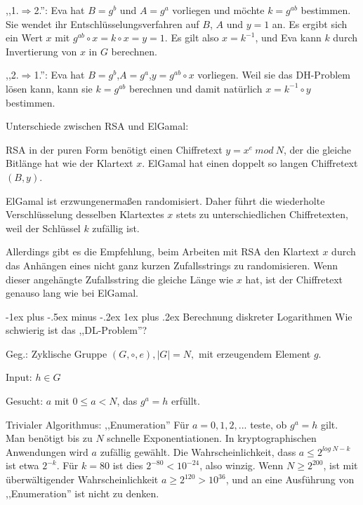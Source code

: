 \documentclass[a4paper]{article}
\makeatletter
\renewcommand{\subsubsection}{\@startsection{subsubsection}{3}{0mm}%
 {-1ex plus -.5ex minus -.2ex}%
 {1ex plus .2ex}%
 {\normalfont\small\bfseries}}
\makeatother
\begin{document}
\begin{multicols}{3}
        \begin{itemize*}
            \item ,,1.$\Rightarrow$2.'': Eva hat $B=g^b$ und $A=g^a$ vorliegen und möchte $k=g^{ab}$ bestimmen. Sie wendet ihr Entschlüsselungsverfahren auf $B$, $A$ und $y=1$ an. Es ergibt sich ein Wert $x$ mit $g^{ab}\circ x=k\circ x=y=1$. Es gilt also $x=k^{-1}$, und Eva kann $k$ durch Invertierung von $x$ in $G$ berechnen.
            \item ,,2.$\Rightarrow$1.'': Eva hat $B=g^b$,$A=g^a$,$y=g^{ab}\circ x$ vorliegen. Weil sie das DH-Problem lösen kann, kann sie $k=g^{ab}$ berechnen und damit natürlich $x=k^{-1}\circ y$ bestimmen.
        \end{itemize*}

        Unterschiede zwischen RSA und ElGamal:
        \begin{itemize*}
            \item RSA in der puren Form benötigt einen Chiffretext $y=x^e\ mod\ N$, der die gleiche Bitlänge hat wie der Klartext $x$. ElGamal hat einen doppelt so langen Chiffretext $(B,y)$.
            \item ElGamal ist erzwungenermaßen randomisiert. Daher führt die wiederholte Verschlüsselung desselben Klartextes $x$ stets zu unterschiedlichen Chiffretexten, weil der Schlüssel $k$ zufällig ist.
        \end{itemize*}

        Allerdings gibt es die Empfehlung, beim Arbeiten mit RSA den Klartext $x$ durch das Anhängen eines nicht ganz kurzen Zufallsstrings zu
        randomisieren. Wenn dieser angehängte Zufallsstring die gleiche Länge wie $x$ hat, ist der Chiffretext genauso lang wie bei ElGamal.

        \subsubsection{Berechnung diskreter Logarithmen}
        Wie schwierig ist das ,,DL-Problem''?

        Geg.: Zyklische Gruppe $(G,\circ,e),|G|=N,$ mit erzeugendem Element $g$.

        Input: $h\in G$

        Gesucht: $a$ mit $0\leq a<N$, das $g^a=h$ erfüllt.

        Trivialer Algorithmus: ,,Enumeration''
        Für $a=0,1,2 ,...$ teste, ob $g^a=h$ gilt. Man benötigt bis zu $N$ schnelle Exponentiationen. In kryptographischen Anwendungen wird $a$ zufällig gewählt. Die Wahrscheinlichkeit, dass $a\leq 2^{log\ N-k}$ ist etwa $2^{-k}$. Für $k= 80$ ist dies $2^{-80}< 10^{-24}$, also winzig. Wenn $N\geq 2^{200}$, ist mit überwältigender Wahrscheinlichkeit $a\geq 2^{120}> 10^{36}$, und an eine Ausführung von ,,Enumeration'' ist nicht zu denken.


\end{multicols}
\end{document}
